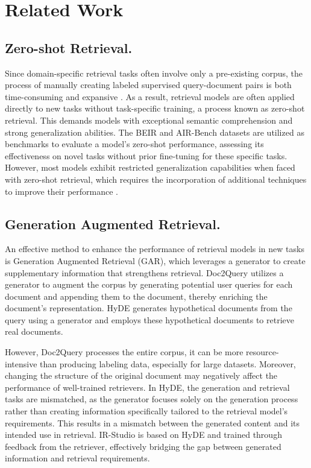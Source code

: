 \section{Related Work}
\subsection{Zero-shot Retrieval.}

Since domain-specific retrieval tasks often involve only a pre-existing corpus, the process of manually creating labeled supervised query-document pairs is both time-consuming and expansive \cite{thakur2021beir}. As a result, retrieval models are often applied directly to new tasks without task-specific training, a process known as zero-shot retrieval. This demands models with exceptional semantic comprehension and strong generalization abilities. The BEIR \cite{thakur2021beir} and AIR-Bench \cite{chen2024air} datasets are utilized as benchmarks to evaluate a model's zero-shot performance, assessing its effectiveness on novel tasks without prior fine-tuning for these specific tasks. However, most models exhibit restricted generalization capabilities when faced with zero-shot retrieval, which requires the incorporation of additional techniques to improve their performance \cite{gao2022precise, wang2021gpl}.

\subsection{Generation Augmented Retrieval.}

An effective method to enhance the performance of retrieval models in new tasks is Generation Augmented Retrieval (GAR), which leverages a generator to create supplementary information that strengthens retrieval. Doc2Query \cite{nogueira2019document} utilizes a generator to augment the corpus by generating potential user queries for each document and appending them to the document, thereby enriching the document's representation. HyDE \cite{gao2022precise} generates hypothetical documents from the query using a generator and employs these hypothetical documents to retrieve real documents.

However, Doc2Query processes the entire corpus, it can be more resource-intensive than producing labeling data, especially for large datasets. Moreover, changing the structure of the original document may negatively affect the performance of well-trained retrievers. In HyDE, the generation and retrieval tasks are mismatched, as the generator focuses solely on the generation process rather than creating information specifically tailored to the retrieval model's requirements. This results in a mismatch between the generated content and its intended use in retrieval.
IR-Studio is based on HyDE and trained through feedback from the retriever, effectively bridging the gap between generated information and retrieval requirements.

